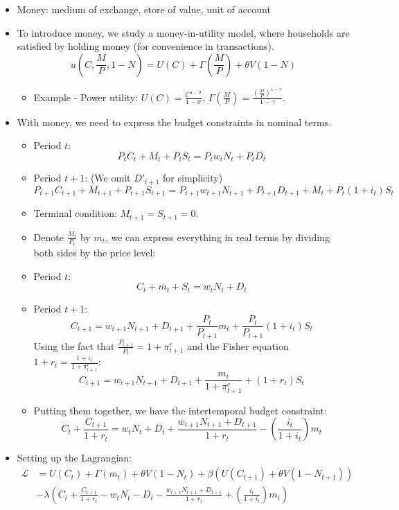 \documentclass[notitlepage]{article}
\begin{document}
\begin{itemize}
\item Money: medium of exchange, store of value, unit of account
\item To introduce money, we study a money-in-utility model, where households are satisfied by holding money (for convenience in transactions).
\[
u\left(C, \frac{M}{P}, 1-N\right) = U(C) + \Gamma\left(\frac{M}{P}\right) + \theta V(1-N)
\]
\begin{itemize}
\item Example - Power utility: $U(C) = \frac{C^{1-\sigma}}{1-\sigma}$, $\Gamma\left(\frac{M}{P}\right) = \frac{\left(\frac{M}{P}\right)^{1-\gamma}}{1-\gamma}$.
\end{itemize}
\item With money, we need to express the budget constraints in nominal terms.
\begin{itemize}
\item Period $t$:
\[
P_tC_t + M_t + P_tS_t = P_tw_tN_t + P_tD_t
\]
\item Period $t+1$: (We omit $D'_{t+1}$ for simplicity)
\[
P_{t+1}C_{t+1} + M_{t+1} + P_{t+1}S_{t+1} = P_{t+1}w_{t+1}N_{t+1} + P_{t+1}D_{t+1} + M_t + P_t(1+i_t)S_t
\]
\item Terminal condition: $M_{t+1} = S_{t+1} = 0$.
\item Denote $\frac{M_t}{P_t}$ by $m_t$, we can express everything in real terms by dividing both sides by the price level:
\item Period $t$:
\[
C_t + m_t + S_t = w_tN_t + D_t
\]
\item Period $t+1$: 
\[
C_{t+1} = w_{t+1}N_{t+1} + D_{t+1} + \frac{P_t}{P_{t+1}}m_t + \frac{P_t}{P_{t+1}}(1+i_t)S_t
\]
Using the fact that $\frac{P_{t+1}}{P_{t}} = 1+\pi^e_{t+1}$ and the Fisher equation $1+r_t = \frac{1+i_t}{1+\pi^e_{t+1}}$:
\[
C_{t+1} = w_{t+1}N_{t+1} + D_{t+1} + \frac{m_t}{1+\pi^e_{t+1}} + (1+r_t)S_t
\]
\item Putting them together, we have the intertemporal budget constraint: 
\[
C_t + \frac{C_{t+1}}{1+r_t} = w_tN_t + D_t + \frac{w_{t+1}N_{t+1} + D_{t+1}}{1+r_t} - \left(\frac{i_t}{1+i_t}\right)m_t
\]
\end{itemize}
\item Setting up the Lagrangian:
\begin{align*}
\mathcal{L} &= U(C_t) + \Gamma(m_t) + \theta V(1-N_t) + \beta (U(C_{t+1}) + \theta V(1-N_{t+1})) \\
&- \lambda \left(C_t + \frac{C_{t+1}}{1+r_t} - w_tN_t - D_t - \frac{w_{t+1}N_{t+1} + D_{t+1}}{1+r_t} + \left(\frac{i_t}{1+i_t}\right)m_t\right)

\end{align*}
\end{itemize}
\end{document}

